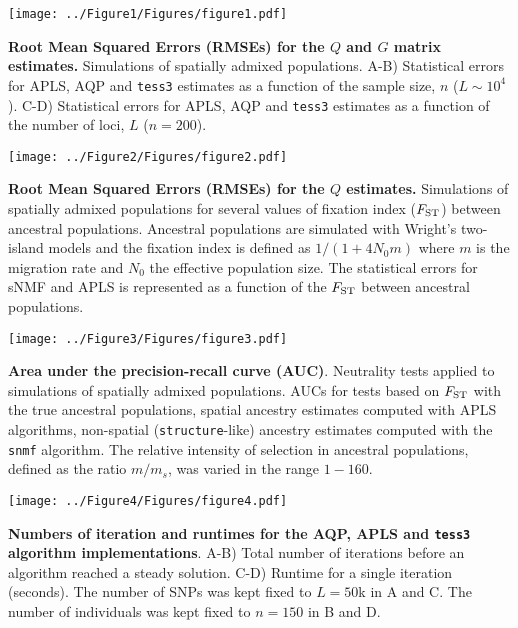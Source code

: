 \clearpage 
\newpage


\begin{center}
\texttt{[image: ../Figure1/Figures/figure1.pdf]}
\end{center}  
 {\bf Root Mean Squared Errors (RMSEs) for the $Q$ and $G$ matrix estimates.} Simulations of spatially admixed populations. A-B) Statistical errors for APLS, AQP and {\tt tess3} estimates as a function of the sample size, $n$ ($L \sim 10^4$). C-D) Statistical errors for APLS, AQP and {\tt tess3} estimates as a function of the number of loci, $L$ ($n = 200$).

\clearpage 
\newpage


\begin{center}
\texttt{[image: ../Figure2/Figures/figure2.pdf]}
\end{center}  
 {\bf Root Mean Squared Errors (RMSEs) for the $Q$ estimates.} Simulations of spatially admixed populations for several values of fixation index ($F_{\rm ST}$) between ancestral populations. Ancestral populations are simulated with Wright’s two-island models and the fixation index is defined as $1 / (1 + 4 N_0 m)$ where $m$ is the migration rate and $N_0$ the effective population size. The statistical errors for sNMF and APLS is represented as a function of the $F_{\rm ST}$ between ancestral populations. 

\clearpage 
\newpage

\begin{center}
\texttt{[image: ../Figure3/Figures/figure3.pdf]}
\end{center}
 {\bf Area under the precision-recall curve (AUC)}. Neutrality tests applied to simulations of spatially admixed populations. AUCs for tests based on $F_{\rm ST}$ with the true ancestral populations,  spatial ancestry estimates computed with APLS algorithms, non-spatial ({\tt structure}-like) ancestry estimates computed with the {\tt snmf} algorithm. The relative intensity of selection in ancestral populations, defined as the ratio $m/m_s$, was varied in the range $1-160$.


\clearpage 
\newpage

\begin{center}
\texttt{[image: ../Figure4/Figures/figure4.pdf]}
\end{center}
 {\bf Numbers of iteration and runtimes for the AQP, APLS and {\tt tess3} algorithm implementations}. A-B)   Total number of iterations before an algorithm reached a steady solution. C-D) Runtime for a single iteration (seconds). The number of SNPs was kept fixed to $L = 50$k in A and C. The number of individuals was kept fixed to $n = 150$ in B and D.


